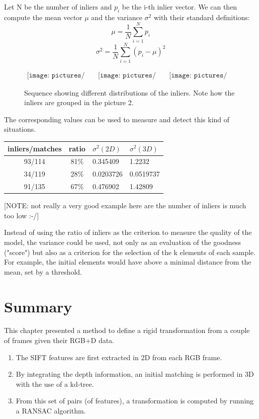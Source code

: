 Let N be the number of inliers and $p_i$ be the i-th inlier vector. We can then compute the mean vector $\mu$ and the variance $\sigma^2$ with their standard definitions:
\[
\mu = \frac{1}{N} \sum_{i=1}^N{p_i}
\]
\[
\sigma^2 = \frac{1}{N} \sum_{i=1}^N{(p_i - \mu)^2}
\]

\begin{figure}[h!]
\centering$
\begin{array}{cccc}
\texttt{[image: pictures/bad\_transform1]} &
\texttt{[image: pictures/bad\_transform2]} &
\texttt{[image: pictures/bad\_transform3]}
\end{array}$
\caption{Sequence showing different distributions of the inliers. Note how the inliers are grouped in the picture 2.}
\end{figure}

The corresponding values can be used to measure and detect this kind of situations.

\begin{tabular}{ccll}
inliers/matches & ratio & $\sigma^2(2D)$ & $\sigma^2(3D)$\\
\hline
93/114 &	81\% &	0.345409 &	1.2232\\
34/119 &	28\% &	0.0203726 &	0.0519737\\
91/135 &	67\% &	0.476902 &	1.42809\\
\end{tabular}

[NOTE: not really a very good example here are the number of inliers is much too low :-/]

Instead of using the ratio of inliers as the criterion to measure the quality of the model, the variance could be used, not only as an evaluation of the goodness ("score") but also as a criterion for the selection of the k elements of each sample. For example, the initial elements would have above a minimal distance from the mean, set by a threshold.

\section{Summary}

This chapter presented a method to define a rigid transformation from a couple of frames given their RGB+D data.
\begin{enumerate}
\item The SIFT features are first extracted in 2D from each RGB frame.
\item By integrating the depth information, an initial matching is performed in 3D with the use of a kd-tree.
\item From this set of pairs (of features), a transformation is computed by running a RANSAC algorithm.
\end{enumerate}

